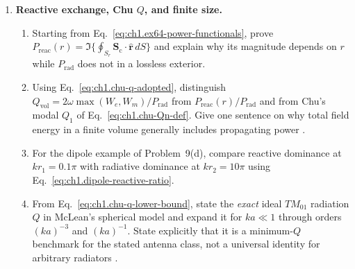 \begin{enumerate}
\item \textbf{Reactive exchange, Chu $Q$, and finite size.}
\begin{enumerate}[label=(\alph*)]
\item Starting from Eq.~\eqref{eq:ch1.ex64-power-functionals}, prove $P_{\mathrm{reac}}(r)=\Im\{\oint_{S_r}\mathbf{S}_\mathrm{c}\cdot\hat{\mathbf{r}}\,dS\}$ and explain why its magnitude depends on $r$ while $P_{\mathrm{rad}}$ does not in a lossless exterior.
\item Using Eq.~\eqref{eq:ch1.chu-q-adopted}, distinguish $Q_{\mathrm{vol}}=2\omega\max(W_e,W_m)/P_{\mathrm{rad}}$ from $P_{\mathrm{reac}}(r)/P_{\mathrm{rad}}$ and from Chu's modal $Q_1$ of Eq.~\eqref{eq:ch1.chu-Qn-def}. Give one sentence on why total field energy in a finite volume generally includes propagating power \cite{chu1948,mcclean1996}.
\item For the dipole example of Problem~9(d), compare reactive dominance at $kr_1=0.1\pi$ with radiative dominance at $kr_2=10\pi$ using Eq.~\eqref{eq:ch1.dipole-reactive-ratio}.
\item From Eq.~\eqref{eq:ch1.chu-q-lower-bound}, state the \emph{exact} ideal $TM_{01}$ radiation $Q$ in McLean's spherical model and expand it for $ka\ll1$ through orders $(ka)^{-3}$ and $(ka)^{-1}$. State explicitly that it is a minimum-$Q$ benchmark for the stated antenna class, not a universal identity for arbitrary radiators \cite{mcclean1996,chu1948}.
\end{enumerate}
\end{enumerate}
